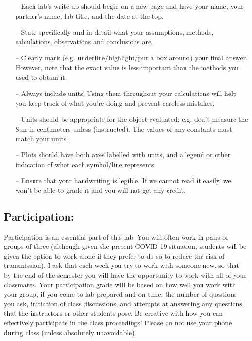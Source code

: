\documentclass[11pt]{article}
\begin{document}
\begin{itemize}
\item[--] Each lab's write-up should begin on a new page and have your name, your partner's name, lab title, and the date at the top.
\item[--] State specifically and in detail what your assumptions, methods, calculations, observations and conclusions are.
\item[--] Clearly mark (e.g. underline/highlight/put a box around) your final answer. However, note that the exact value is less important than the methods you used to obtain it.
\item[--] Always include units! Using them throughout your calculations will help you keep track of what you're doing and prevent careless mistakes. 
\item[--] Units should be appropriate for the object evaluated; e.g. don't measure the Sun in centimeters unless (instructed). The values of any constants must match your units!
\item[--] Plots should have both axes labelled with units, and a legend or other indication of what each symbol/line represents.
\item[--] Ensure that your handwriting is legible. If we cannot read it easily, we won't be able to grade it and you will not get any credit. \\
\end{itemize}
 
\subsection*{Participation:}
\noindent Participation is an essential part of this lab. You will often work in pairs or groups of three (although given the present COVID-19 situation, students will be given the option to work alone if they prefer to do so to reduce the risk of transmission). I ask that each week you try to work with someone new, so that by the end of the semester you will have the opportunity to work with all of your classmates. Your participation grade will be based on how well you work with your group, if you come to lab prepared and on time, the number of questions you ask, initiation of class discussions, and attempts at answering any questions that the instructors or other students pose. Be creative with how you can effectively participate in the class proceedings! Please do not use your phone during class (unless absolutely unavoidable).\\
\end{document}
